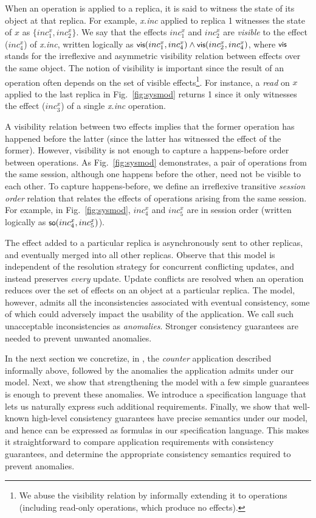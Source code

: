 When an operation is applied to a replica, it is said to witness the
state of its object at that replica.  For example, \emph{x.inc}
applied to replica 1 witnesses the state of $x$ as
$\{inc^x_1,inc^x_2\}$.  We say that the effects $inc^x_1$ and
$inc^x_2$ are \emph{visible} to the effect ($inc^x_4$) of
\emph{x.inc}, written logically as $\small {\normalfont \textsf{vis}(inc^x_1,inc^x_4)}
\wedge {\normalfont \textsf{vis}(inc^x_2,inc^x_4)}$, where $\small {\normalfont \textsf{vis}}$ stands for the
irreflexive and asymmetric visibility relation between effects over
the same object. The notion of visibility is important since the
result of an operation often depends on the set of visible
effects\footnote{We abuse the visibility relation by informally
  extending it to operations (including read-only operations, which
  produce no effects).}. For instance, a \emph{read} on $x$ applied to
the last replica in Fig.~\ref{fig:sysmod} returns 1 since it only
witnesses the effect ($inc^x_3$) of a single \emph{x.inc} operation.

A visibility relation between two effects implies that the former
operation has happened before the latter (since the latter has
witnessed the effect of the former). However, visibility is not enough
to capture a happens-before order between operations. As
Fig.~\ref{fig:sysmod} demonstrates, a pair of operations from the same
session, although one happens before the other, need not be visible to
each other. To capture happens-before, we define an irreflexive
transitive \emph{session order} relation that relates the effects of
operations arising from the same session. For example, in
Fig.~\ref{fig:sysmod}, $inc^x_4$ and $inc^x_5$ are in session order
(written logically as $\small {\normalfont \textsf{so}(inc^x_4,inc^x_5)}$).

The effect added to a particular replica is asynchronously sent to
other replicas, and eventually merged into all other replicas. Observe
that this model is independent of the resolution strategy for
concurrent conflicting updates, and instead preserves \emph{every}
update. Update conflicts are resolved when an operation reduces over
the set of effects on an object at a particular replica. The model,
however, admits all the inconsistencies associated with eventual
consistency, some of which could adversely impact the usability of the
application. We call such unacceptable inconsistencies as
\emph{anomalies}. Stronger consistency guarantees are needed to
prevent unwanted anomalies.

In the next section we concretize, in \name, the \emph{counter}
application described informally above, followed by the anomalies the
application admits under our model.  Next, we show that strengthening
the model with a few simple guarantees is enough to prevent these
anomalies. We introduce a specification language that lets us
naturally express such additional requirements. Finally, we show that
well-known high-level consistency guarantees have precise semantics
under our model, and hence can be expressed as formulas in our
specification language. This makes it straightforward to compare
application requirements with consistency guarantees, and determine
the appropriate consistency semantics required to prevent anomalies.


